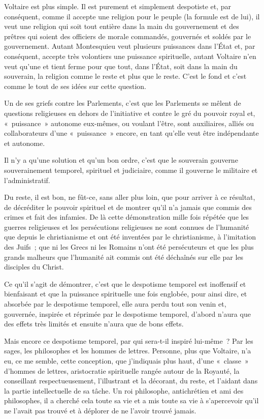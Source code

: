 \documentclass[french,twoside]{book} %
\begin{document}
Voltaire est plus simple. Il est purement et simplement despotiste et, par conséquent, comme il accepte une religion pour le peuple (la formule est de lui), il veut une religion qui soit tout entière dans la main du gouvernement et des prêtres qui soient des officiers de morale commandés, gouvernés et soldés par le gouvernement. Autant Montesquieu veut plusieurs puissances dans l’État et, par conséquent, accepte très volontiers une puissance spirituelle, autant Voltaire n’en veut qu’une et tient ferme pour que tout, dans l’État, soit dans la main du souverain, la religion comme le reste et  plus que le reste. C’est le fond et c’est comme le tout de ses idées sur cette question.\par
Un de ses griefs contre les Parlements, c’est que les Parlements se mêlent de questions religieuses en dehors de l’initiative et contre le gré du pouvoir royal et, « puissance » autonome eux-mêmes, ou voulant l’être, sont auxiliaires, alliés ou collaborateurs d’une « puissance » encore, en tant qu’elle veut être indépendante et autonome.\par
Il n’y a qu’une solution et qu’un bon ordre, c’est que le souverain gouverne souverainement temporel, spirituel et judiciaire, comme il gouverne le militaire et l’administratif.\par
Du reste, il est bon, ne fût-ce, sans aller plus loin, que pour arriver à ce résultat, de décréditer le pouvoir spirituel et de montrer qu’il n’a jamais que commis des crimes et fait des infamies. De là cette démonstration mille fois répétée que les guerres religieuses et les persécutions religieuses ne sont connues de l’humanité que depuis le christianisme et ont été inventées par le christianisme, à l’imitation des Juifs ; que ni les Grecs ni les Romains n’ont été persécuteurs et que les plus grands malheurs que l’humanité ait commis ont été déchaînés sur elle par les disciples du Christ.\par
Ce qu’il s’agit de démontrer, c’est que le despotisme  temporel est inoffensif et bienfaisant et que la puissance spirituelle une fois englobée, pour ainsi dire, et absorbée par le despotisme temporel, elle aura perdu tout son venin et, gouvernée, inspirée et réprimée par le despotisme temporel, d’abord n’aura que des effets très limités et ensuite n’aura que de bons effets.\par
Mais encore ce despotisme temporel, par qui sera-t-il inspiré lui-même ? Par les sages, les philosophes et les hommes de lettres. Personne, plus que Voltaire, n’a eu, ce me semble, cette conception, que j’indiquais plus haut, d’une « classe » d’hommes de lettres, aristocratie spirituelle rangée autour de la Royauté, la conseillant respectueusement, l’illustrant et la décorant, du reste, et l’aidant dans la partie intellectuelle de sa tâche. Un roi philosophe, antichrétien et ami des philosophes, il a cherché cela toute sa vie et a mis toute sa vie à s’apercevoir qu’il ne l’avait pas trouvé et à déplorer de ne l’avoir trouvé jamais.\par
\end{document}
